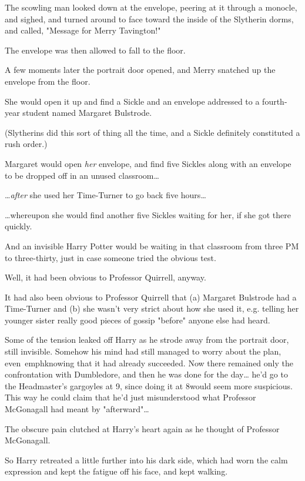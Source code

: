 The scowling man looked down at the envelope, peering at it through a monocle, 
and sighed, and turned around to face toward the inside of the Slytherin dorms, 
and called, "Message for Merry Tavington!"

The envelope was then allowed to fall to the floor.

A few moments later the portrait door opened, and Merry snatched up the 
envelope from the floor.

She would open it up and find a Sickle and an envelope addressed to a 
fourth-year student named Margaret Bulstrode.

(Slytherins did this sort of thing all the time, and a Sickle definitely 
constituted a rush order.)

Margaret would open \emph{her} envelope, and find five Sickles along with an 
envelope to be dropped off in an unused classroom{\ldots}

{\ldots}\emph{after} she used her Time-Turner to go back five hours{\ldots}

{\ldots}whereupon she would find another five Sickles waiting for her, if she 
got there quickly.

And an invisible Harry Potter would be waiting in that classroom from three PM 
to three-thirty, just in case someone tried the obvious test.

Well, it had been obvious to Professor Quirrell, anyway.

It had also been obvious to Professor Quirrell that (a) Margaret Bulstrode had 
a Time-Turner and (b) she wasn't very strict about how she used it, e.g. 
telling her younger sister really good pieces of gossip "before" anyone else 
had heard.

Some of the tension leaked off Harry as he strode away from the portrait door, 
still invisible. Somehow his mind had still managed to worry about the plan, 
even\ emph{knowing} that it had already succeeded. Now there remained only the 
confrontation with Dumbledore, and then he was done for the day{\ldots} he'd go 
to the Headmaster's gargoyles at 9\PM, since doing it at 8\PM would seem more 
suspicious. This way he could claim that he'd just misunderstood what Professor 
McGonagall had meant by "afterward"{\ldots}

The obscure pain clutched at Harry's heart again as he thought of Professor 
McGonagall.

So Harry retreated a little further into his dark side, which had worn the calm 
expression and kept the fatigue off his face, and kept walking.

